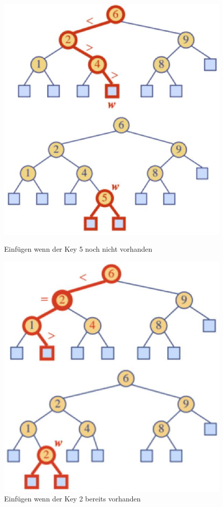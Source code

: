 \begin{description}
\begin{itemize}
	\end{itemize}
	\begin{figure}[ht!]
		\centering
		\begin{minipage}[t]{0.4\textwidth}
			\centering
			\includegraphics[width=0.9\linewidth]{images/search_tree_insert_1}
			\caption{Einfügen wenn der Key 5 noch nicht vorhanden}
			\label{fig:searchtreeinsert1}
		\end{minipage}
		\begin{minipage}[t]{0.4\textwidth}
			\centering
			\includegraphics[width=0.9\linewidth]{images/search_tree_insert_2}
			\caption{Einfügen wenn der Key 2 bereits vorhanden}
			\label{fig:searchtreeinsert2}
		\end{minipage}
	\end{figure}


\end{description}
